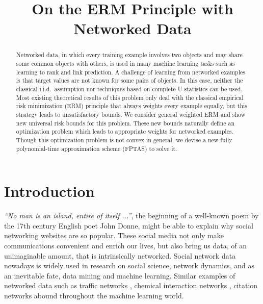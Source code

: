 \documentclass[letterpaper]{article} %
\begin{document}
\title{On the ERM Principle with Networked Data}

\author{%
}
\maketitle

\begin{abstract}
Networked data, in which every training example involves two objects and may share some common objects with others, is used in many machine learning tasks such as learning to rank and link prediction. 
A challenge of learning from networked examples is that target values are not known for some pairs of objects. 
In this case, neither the classical i.i.d.\ assumption nor techniques based on complete U-statistics can be used. 
Most existing theoretical results of this problem only deal with the classical empirical risk minimization (ERM) principle that always weights every example equally, 
but this strategy leads to unsatisfactory bounds. 
We consider general weighted ERM and show new universal risk bounds for this problem. 
These new bounds naturally define an optimization problem which leads to appropriate weights for networked examples. 
Though this optimization problem is not convex in general, we devise a new fully polynomial-time approximation scheme (FPTAS) to solve it. 
\end{abstract}

\section{Introduction}
\label{sec:introduction}
\textit{``No man is an island, entire of itself ...''}, the beginning of a well-known poem by the 17th century English poet John Donne, might be able to explain why social networking websites are so popular. 
These social media not only make communications convenient and enrich our lives, but also bring us data, of an unimaginable amount, that is intrinsically networked. 
Social network data nowadays is widely used in research on social science, network dynamics, and as an inevitable fate, data mining and machine learning\cite{scott2017social}. 
Similar examples of networked data such as traffic networks \cite{min2011real}, chemical interaction networks \cite{szklarczyk2014string}, citation networks \cite{dawson2014current} abound throughout the machine learning world. 
\end{document}
